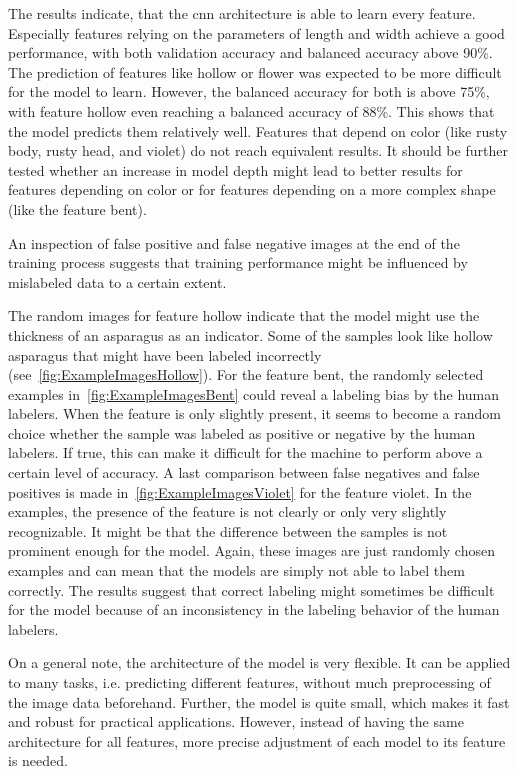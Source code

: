 \bigskip
The results indicate, that the \acrshort{cnn} architecture is able to learn every feature. Especially features relying on the parameters of length and width achieve a good performance, with both validation accuracy and balanced accuracy above 90\%. The prediction of features like hollow or flower was expected to be more difficult for the model to learn. However, the balanced accuracy for both is above 75\%, with feature hollow even reaching a balanced accuracy of 88\%. This shows that the model predicts them relatively well. Features that depend on color (like rusty body, rusty head, and violet) do not reach equivalent results. It should be further tested whether an increase in model depth might lead to better results for features depending on color or for features depending on a more complex shape (like the feature bent).
 
An inspection of false positive and false negative images at the end of the training process suggests that training performance might be influenced by mislabeled data to a certain extent.
 
The random images for feature hollow indicate that the model might use the thickness of an asparagus as an indicator. Some of the samples look like hollow asparagus that might have been labeled incorrectly (see~\autoref{fig:ExampleImagesHollow}).
For the feature bent, the randomly selected examples in~\autoref{fig:ExampleImagesBent} could reveal a labeling bias by the human labelers. When the feature is only slightly present, it seems to become a random choice whether the sample was labeled as positive or negative by the human labelers. If true, this can make it difficult for the machine to perform above a certain level of accuracy.
A last comparison between false negatives and false positives is made in~\autoref{fig:ExampleImagesViolet} for the feature violet. In the examples, the presence of the feature is not clearly or only very slightly recognizable. It might be that the difference between the samples is not prominent enough for the model.
Again, these images are just randomly chosen examples and can mean that the models are simply not able to label them correctly. The results suggest that correct labeling might sometimes be difficult for the model because of an inconsistency in the labeling behavior of the human labelers.
 
On a general note, the architecture of the model is very flexible. It can be applied to many tasks, i.e. predicting different features, without much preprocessing of the image data beforehand. Further, the model is quite small, which makes it fast and robust for practical applications. However, instead of having the same architecture for all features, more precise adjustment of each model to its feature is needed.
 
